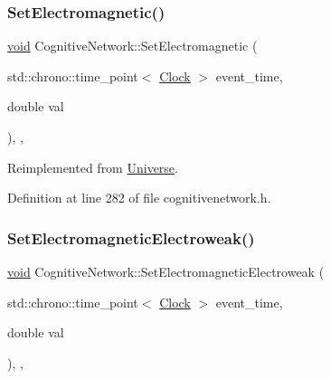 \mbox{\label{class_cognitive_network_a31764cd5746369d16b45f2ff74806a0b}} 
\subsubsection{\texorpdfstring{Set\+Electromagnetic()}{SetElectromagnetic()}}
{\footnotesize\ttfamily \mbox{\hyperlink{glad_8h_a950fc91edb4504f62f1c577bf4727c29}{void}} Cognitive\+Network\+::\+Set\+Electromagnetic (\begin{DoxyParamCaption}\item[{std\+::chrono\+::time\+\_\+point$<$ \mbox{\hyperlink{universe_8h_a0ef8d951d1ca5ab3cfaf7ab4c7a6fd80}{Clock}} $>$}]{event\+\_\+time,  }\item[{double}]{val }\end{DoxyParamCaption})\hspace{0.3cm}{\ttfamily [inline]}, {\ttfamily [final]}, {\ttfamily [virtual]}}



Reimplemented from \mbox{\hyperlink{class_universe_aa981fc7e252b1fbbb675f0371860954d}{Universe}}.



Definition at line 282 of file cognitivenetwork.\+h.

\mbox{\label{class_cognitive_network_a270f6842ec14b3e5b80dedf7b48ea6f4}} 
\subsubsection{\texorpdfstring{Set\+Electromagnetic\+Electroweak()}{SetElectromagneticElectroweak()}}
{\footnotesize\ttfamily \mbox{\hyperlink{glad_8h_a950fc91edb4504f62f1c577bf4727c29}{void}} Cognitive\+Network\+::\+Set\+Electromagnetic\+Electroweak (\begin{DoxyParamCaption}\item[{std\+::chrono\+::time\+\_\+point$<$ \mbox{\hyperlink{universe_8h_a0ef8d951d1ca5ab3cfaf7ab4c7a6fd80}{Clock}} $>$}]{event\+\_\+time,  }\item[{double}]{val }\end{DoxyParamCaption})\hspace{0.3cm}{\ttfamily [inline]}, {\ttfamily [final]}, {\ttfamily [virtual]}}



